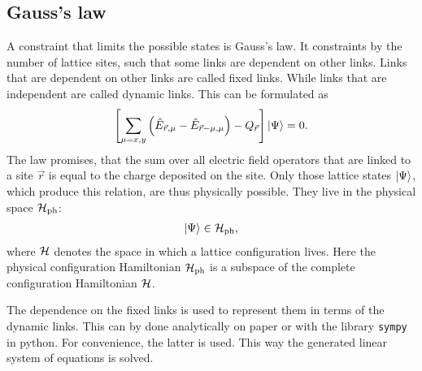 \subsection{Gauss's law}
A constraint that limits the possible states is Gauss's law. It constraints by the number of lattice sites, such that some links are dependent on other links. Links that are dependent on other links are called fixed links. While links that are independent are called dynamic links. This can be formulated as 
\begin{align}
  \left[\sum_{\mu=x,y}\left(\hat{E}_{\vec{r},\mu}-\hat{E}_{\vec{r}-\mu,\mu}\right)-Q_{\vec{r}}\right]\ket{\Psi}=0.
\end{align}
The law promises, that the sum over all electric field operators that are linked to a site $\vec{r}$ is equal to the charge deposited on the site. Only those lattice states $\ket{\Psi}$, which produce this relation, are thus physically possible. They live in the physical space $\cal{H}_{\text{ph}}$:
\begin{align}
	\ket{\Psi}\in\cal{H}_{\text{ph}},
\end{align}
where $\cal{H}$ denotes the space in which a lattice configuration lives. Here the physical configuration Hamiltonian $\cal{H}_{\text{ph}}$ is a subspace of the complete configuration Hamiltonian $\cal{H}$.

The dependence on the fixed links is used to represent them in terms of the dynamic links. This can by done analytically on paper or with the library \texttt{sympy}\cite{10.7717/peerj-cs.103} in python. For convenience, the latter is used. This way the generated linear system of equations is solved.



